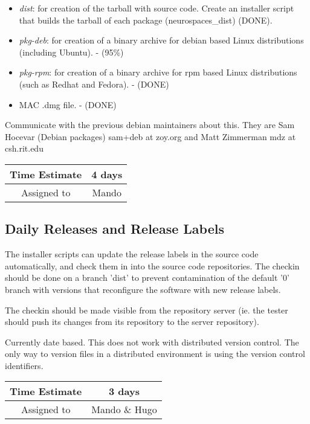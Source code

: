 \documentclass[12pt]{article}
\begin{document}
\begin{itemize}
\item {\it dist}: for creation of the tarball with source code.
  Create an installer script that builds the tarball of each package
  (neurospaces\_dist) (DONE).
\item {\it pkg-deb}: for creation of a binary archive for debian based
  Linux distributions (including Ubuntu). - (95\%)
\item {\it pkg-rpm}: for creation of a binary archive for rpm based Linux
  distributions (such as Redhat and Fedora). - (DONE)
\item MAC .dmg file. - (DONE)
\end{itemize}

Communicate with the previous debian maintainers about this.  They are
Sam Hocevar (Debian packages) sam+deb at zoy.org and Matt Zimmerman
mdz at csh.rit.edu

\begin{center}
  \vspace{5mm}
  \centering
  \begin{tabular}{|c|c|}
    \hline
    Time Estimate
    & 4 days \\
    \hline
    Assigned to
    & Mando \\
    \hline
  \end{tabular}
\end{center}


\subsection{Daily Releases and Release Labels}

The installer scripts can update the release labels in the source code
automatically, and check them in into the source code repositories.
The checkin should be done on a branch 'dist' to prevent contamination
of the default '0' branch with versions that reconfigure the software
with new release labels.

The checkin should be made visible from the repository server (ie. the
tester should push its changes from its repository to the server
repository).

Currently date based.  This does not work with distributed version
control.  The only way to version files in a distributed environment
is using the version control identifiers.

\begin{center}
  \vspace{5mm}
  \centering
  \begin{tabular}{|c|c|}
    \hline
    Time Estimate
    & 3 days \\
    \hline
    Assigned to
    & Mando \& Hugo \\
    \hline
  \end{tabular}
\end{center}
\end{document}
